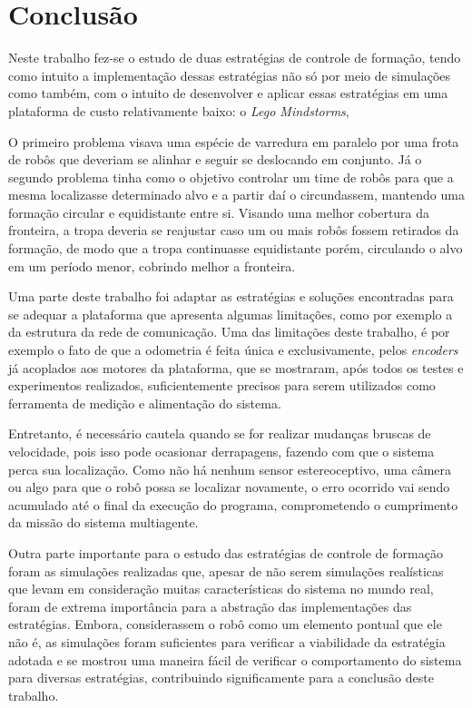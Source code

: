 \chapter{Conclusão}
\label{chap:conclusao}

Neste trabalho fez-se o estudo de duas estratégias de controle de formação, tendo como intuito a implementação dessas estratégias não só por meio de simulações como também, com o intuito de desenvolver e aplicar essas estratégias em uma plataforma de custo relativamente baixo: o \emph{Lego Mindstorms\textregistered},  

O primeiro problema visava uma espécie de varredura em paralelo por uma frota de robôs que deveriam se alinhar e seguir se deslocando em conjunto. Já o segundo problema tinha como o objetivo controlar um time de robôs para que a mesma localizasse determinado alvo e a partir daí o circundassem, mantendo uma formação circular e equidistante entre si. Visando uma melhor cobertura da fronteira, a tropa deveria se reajustar caso um ou mais robôs fossem retirados da formação, de modo que a tropa continuasse equidistante porém, circulando o alvo em um período menor, cobrindo melhor a fronteira.

Uma parte deste trabalho foi adaptar as estratégias e soluções encontradas para se adequar a plataforma que apresenta algumas limitações, como por exemplo a da estrutura da rede de comunicação. Uma das limitações deste trabalho, é por exemplo o fato de que a odometria é feita única e exclusivamente, pelos \emph{encoders} já acoplados aos motores da plataforma, que se mostraram, após todos os testes e experimentos realizados, suficientemente precisos para serem utilizados como ferramenta de medição e alimentação do sistema. 

Entretanto, é necessário cautela quando se for realizar mudanças bruscas de velocidade, pois isso pode ocasionar derrapagens, fazendo com que o sistema perca sua localização. Como não há nenhum %
sensor estereoceptivo, uma câmera ou algo para que o robô possa se localizar novamente, o erro ocorrido vai sendo acumulado até o final da execução do programa, comprometendo o cumprimento da missão do sistema multiagente.%

Outra parte importante para o estudo das estratégias de controle de formação foram as simulações realizadas que, apesar de não serem simulações realísticas que levam em consideração muitas características do sistema no mundo real, foram de extrema importância para a abstração das implementações das estratégias. Embora, considerassem o robô como um elemento pontual que ele não é, as simulações foram suficientes para verificar a viabilidade da estratégia adotada e se mostrou uma maneira fácil de verificar o comportamento do sistema para diversas estratégias, contribuindo significamente para a conclusão deste trabalho.

